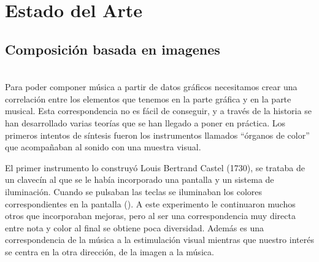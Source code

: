 \section{Estado del Arte}
\label{sec:estadodelarte}



\subsection{Composición basada en imagenes}

\\

Para poder componer música a partir de datos gráficos necesitamos crear una correlación entre los elementos que tenemos en la parte gráfica y en la parte musical. Esta correspondencia no es fácil de conseguir, y a través de la historia se han desarrollado varias teorías que se han llegado a poner en práctica. Los primeros intentos de síntesis fueron los instrumentos llamados ``órganos de color'' que acompañaban al sonido con una muestra visual.

El primer instrumento lo construyó Louis Bertrand Castel (1730), se trataba de un clavecín al que se le había incorporado una pantalla y un sistema de iluminación. Cuando se pulsaban las teclas se iluminaban los colores correspondientes en la pantalla (\cite{organosColor}). \color{blue} A este experimento le continuaron muchos otros que incorporaban mejoras, pero al ser una correspondencia muy directa entre nota y color al final se obtiene poca diversidad. Además es una correspondencia de la música a la estimulación visual mientras que nuestro interés se centra en la otra dirección, de la imagen a la música.\\ \color{black}


